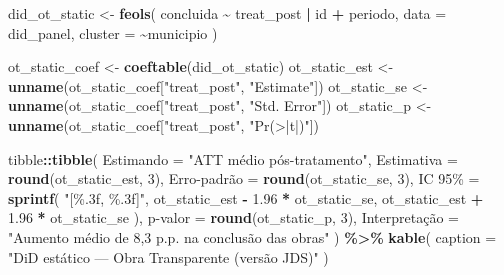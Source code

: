 \documentclass[
]{article}
\newenvironment{Shaded}{\begin{snugshade}}{\end{snugshade}}
\newcommand{\AttributeTok}[1]{\textcolor[rgb]{0.13,0.29,0.53}{#1}}
\newcommand{\DecValTok}[1]{\textcolor[rgb]{0.00,0.00,0.81}{#1}}
\newcommand{\FloatTok}[1]{\textcolor[rgb]{0.00,0.00,0.81}{#1}}
\newcommand{\FunctionTok}[1]{\textcolor[rgb]{0.13,0.29,0.53}{\textbf{#1}}}
\newcommand{\NormalTok}[1]{#1}
\newcommand{\OtherTok}[1]{\textcolor[rgb]{0.56,0.35,0.01}{#1}}
\newcommand{\SpecialCharTok}[1]{\textcolor[rgb]{0.81,0.36,0.00}{\textbf{#1}}}
\newcommand{\StringTok}[1]{\textcolor[rgb]{0.31,0.60,0.02}{#1}}
\begin{document}
\begin{Shaded}
\begin{Highlighting}[]
\NormalTok{did\_ot\_static }\OtherTok{\textless{}{-}} \FunctionTok{feols}\NormalTok{(}
\NormalTok{  concluida }\SpecialCharTok{\textasciitilde{}}\NormalTok{ treat\_post }\SpecialCharTok{|}\NormalTok{ id }\SpecialCharTok{+}\NormalTok{ periodo,}
  \AttributeTok{data =}\NormalTok{ did\_panel,}
  \AttributeTok{cluster =} \SpecialCharTok{\textasciitilde{}}\NormalTok{municipio}
\NormalTok{)}

\NormalTok{ot\_static\_coef }\OtherTok{\textless{}{-}} \FunctionTok{coeftable}\NormalTok{(did\_ot\_static)}
\NormalTok{ot\_static\_est }\OtherTok{\textless{}{-}} \FunctionTok{unname}\NormalTok{(ot\_static\_coef[}\StringTok{"treat\_post"}\NormalTok{, }\StringTok{"Estimate"}\NormalTok{])}
\NormalTok{ot\_static\_se }\OtherTok{\textless{}{-}} \FunctionTok{unname}\NormalTok{(ot\_static\_coef[}\StringTok{"treat\_post"}\NormalTok{, }\StringTok{"Std. Error"}\NormalTok{])}
\NormalTok{ot\_static\_p }\OtherTok{\textless{}{-}} \FunctionTok{unname}\NormalTok{(ot\_static\_coef[}\StringTok{"treat\_post"}\NormalTok{, }\StringTok{"Pr(\textgreater{}|t|)"}\NormalTok{])}

\NormalTok{tibble}\SpecialCharTok{::}\FunctionTok{tibble}\NormalTok{(}
  \AttributeTok{Estimando =} \StringTok{"ATT médio pós{-}tratamento"}\NormalTok{,}
  \AttributeTok{Estimativa =} \FunctionTok{round}\NormalTok{(ot\_static\_est, }\DecValTok{3}\NormalTok{),}
  \StringTok{\textasciigrave{}}\AttributeTok{Erro{-}padrão}\StringTok{\textasciigrave{}} \OtherTok{=} \FunctionTok{round}\NormalTok{(ot\_static\_se, }\DecValTok{3}\NormalTok{),}
  \StringTok{\textasciigrave{}}\AttributeTok{IC 95\%}\StringTok{\textasciigrave{}} \OtherTok{=} \FunctionTok{sprintf}\NormalTok{(}
    \StringTok{"[\%.3f, \%.3f]"}\NormalTok{,}
\NormalTok{    ot\_static\_est }\SpecialCharTok{{-}} \FloatTok{1.96} \SpecialCharTok{*}\NormalTok{ ot\_static\_se,}
\NormalTok{    ot\_static\_est }\SpecialCharTok{+} \FloatTok{1.96} \SpecialCharTok{*}\NormalTok{ ot\_static\_se}
\NormalTok{  ),}
  \StringTok{\textasciigrave{}}\AttributeTok{p{-}valor}\StringTok{\textasciigrave{}} \OtherTok{=} \FunctionTok{round}\NormalTok{(ot\_static\_p, }\DecValTok{3}\NormalTok{),}
\NormalTok{  Interpretação }\OtherTok{=} \StringTok{"Aumento médio de 8,3 p.p. na conclusão das obras"}
\NormalTok{) }\SpecialCharTok{\%\textgreater{}\%}
  \FunctionTok{kable}\NormalTok{(}
    \AttributeTok{caption =} \StringTok{"DiD estático — Obra Transparente (versão JDS)"}
\NormalTok{  )}
\end{Highlighting}
\end{Shaded}
\end{document}
